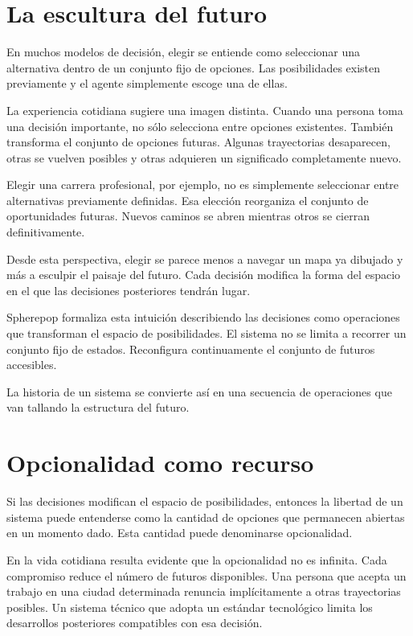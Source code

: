 \documentclass[12pt]{article}
\begin{document}
\section{La escultura del futuro}

En muchos modelos de decisión, elegir se entiende como seleccionar una alternativa dentro de un conjunto fijo de opciones. Las posibilidades existen previamente y el agente simplemente escoge una de ellas.

La experiencia cotidiana sugiere una imagen distinta. Cuando una persona toma una decisión importante, no sólo selecciona entre opciones existentes. También transforma el conjunto de opciones futuras. Algunas trayectorias desaparecen, otras se vuelven posibles y otras adquieren un significado completamente nuevo.

Elegir una carrera profesional, por ejemplo, no es simplemente seleccionar entre alternativas previamente definidas. Esa elección reorganiza el conjunto de oportunidades futuras. Nuevos caminos se abren mientras otros se cierran definitivamente.

Desde esta perspectiva, elegir se parece menos a navegar un mapa ya dibujado y más a esculpir el paisaje del futuro. Cada decisión modifica la forma del espacio en el que las decisiones posteriores tendrán lugar.

Spherepop formaliza esta intuición describiendo las decisiones como operaciones que transforman el espacio de posibilidades. El sistema no se limita a recorrer un conjunto fijo de estados. Reconfigura continuamente el conjunto de futuros accesibles.

La historia de un sistema se convierte así en una secuencia de operaciones que van tallando la estructura del futuro.

\section{Opcionalidad como recurso}

Si las decisiones modifican el espacio de posibilidades, entonces la libertad de un sistema puede entenderse como la cantidad de opciones que permanecen abiertas en un momento dado. Esta cantidad puede denominarse opcionalidad.

En la vida cotidiana resulta evidente que la opcionalidad no es infinita. Cada compromiso reduce el número de futuros disponibles. Una persona que acepta un trabajo en una ciudad determinada renuncia implícitamente a otras trayectorias posibles. Un sistema técnico que adopta un estándar tecnológico limita los desarrollos posteriores compatibles con esa decisión.
\end{document}
